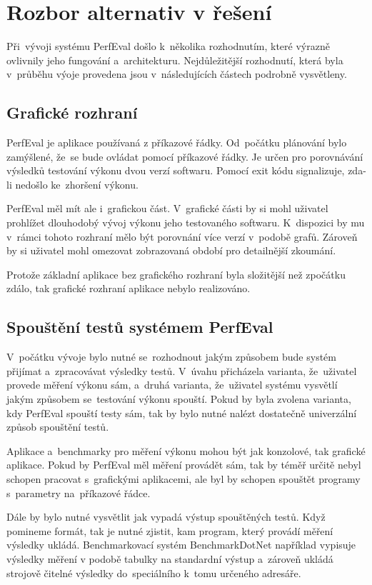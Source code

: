 \section{Rozbor alternativ v řešení}
Při~vývoji systému PerfEval došlo k~několika rozhodnutím, které výrazně ovlivnily jeho fungování a~architekturu.
Nejdůležitější rozhodnutí, která byla v~průběhu výoje provedena jsou v~následujících částech podrobně vysvětleny.

\subsection{Grafické rozhraní}
PerfEval je aplikace používaná z příkazové řádky. Od~počátku plánování bylo zamýšlené, že~se bude
ovládat pomocí příkazové řádky. Je určen pro porovnávání výsledků testování výkonu dvou verzí softwaru.
Pomocí exit kódu signalizuje, zda-li nedošlo ke~zhoršení výkonu.

PerfEval měl mít ale i~grafickou část. V~grafické části by si mohl uživatel prohlížet dlouhodobý vývoj
výkonu jeho testovaného softwaru. K~dispozici by mu v~rámci tohoto rozhraní mělo být porovnání více verzí
v~podobě grafů. Zároveň by si uživatel mohl omezovat zobrazovaná období pro detailnější zkoumání.

Protože základní aplikace bez grafického rozhraní byla složitější než zpočátku zdálo, tak grafické
rozhraní aplikace nebylo realizováno.

\subsection{Spouštění testů systémem PerfEval}
V~počátku vývoje bylo nutné se~rozhodnout jakým způsobem bude systém přijímat a~zpracovávat výsledky testů.
V~úvahu přicházela varianta, že~uživatel provede měření výkonu sám, a~druhá varianta, že~uživatel systému
vysvětlí jakým způsobem se~testování výkonu spouští. Pokud by byla zvolena varianta, kdy PerfEval spouští testy
sám, tak by bylo nutné nalézt dostatečně univerzální způsob spouštění testů.

Aplikace a~benchmarky pro měření výkonu mohou být jak konzolové, tak grafické aplikace. Pokud by PerfEval měl
měření provádět sám, tak by téměř určitě nebyl schopen pracovat s~grafickými aplikacemi, ale byl by schopen
spouštět programy s~parametry na~příkazové řádce.

Dále by bylo nutné vysvětlit jak vypadá výstup spouštěných testů. Když pomineme formát, tak je nutné zjistit,
kam program, který provádí měření výsledky ukládá. Benchmarkovací systém BenchmarkDotNet například vypisuje
výsledky měření v podobě tabulky na standardní výstup a~zároveň ukládá strojově čitelné výsledky do~speciálního
k~tomu určeného adresáře.


